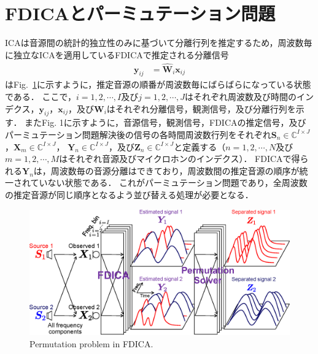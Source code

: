 \documentclass[a4j]{jsarticle}
\begin{document}
\section{FDICAとパーミュテーション問題}
ICAは音源間の統計的独立性のみに基づいて分離行列を推定するため，周波数毎に独立なICAを適用しているFDICAで推定される分離信号
\begin{align}
\bm{y}_{ij} &= \hat{\bm{W}}_i\bm{x}_{ij} \label{eq:sepSig}
\end{align}
はFig.~\ref{fig:permu}に示すように，推定音源の順番が周波数毎にばらばらになっている状態である．
ここで，$i = 1,2, \cdots, I$及び$j = 1,2, \cdots, J$はそれぞれ周波数及び時間のインデクス，$\bm{y}_{ij}$，$\bm{x}_{ij}$，及び$\bm{W}_{i}$はそれぞれ分離信号，観測信号，及び分離行列を示す．
またFig. 1に示すように，音源信号，観測信号，FDICAの推定信号，及びパーミュテーション問題解決後の信号の各時間周波数行列をそれぞれ$\bm{S}_n\in\mathbb{C}^{I\times J}$，$\bm{X}_m\in\mathbb{C}^{I\times J}$，
$\bm{Y}_n\in\mathbb{C}^{I\times J}$，及び$\bm{Z}_n\in\mathbb{C}^{I\times J}$と定義する（$n=1, 2, \cdots, N$及び$m=1, 2, \cdots, M$はそれぞれ音源及びマイクロホンのインデクス）．
FDICAで得られる$\bm{Y}_n$は，周波数毎の音源分離はできており，周波数間の推定音源の順序が統一されていない状態である．
これがパーミュテーション問題であり，全周波数の推定音源が同じ順序となるよう並び替える処理が必要となる．
\begin{figure}[t]
  \vspace{15pt}
  \begin{center}
      \includegraphics[width=1.0\columnwidth]{figures/permutation_image.eps}
  \end{center}
  \vspace{-8pt}
\caption{Permutation problem in FDICA.}
\label{fig:permu}
\end{figure}
\end{document}
